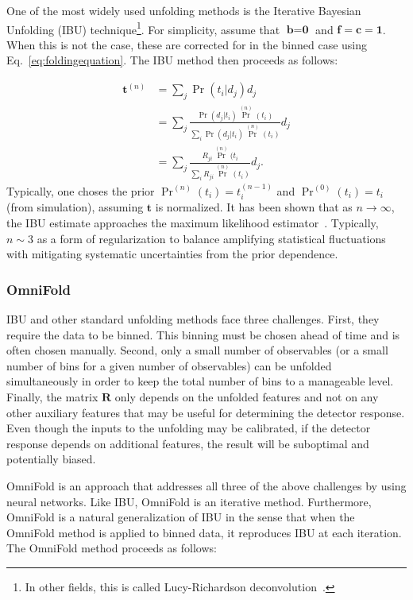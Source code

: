 \documentclass[NOTE, atlasdraft=true, texlive=2016, UKenglish]{\ATLASLATEXPATH atlasdoc}
\begin{document}
One of the most widely used unfolding methods is the Iterative Bayesian Unfolding (IBU) technique\footnote{In other fields, this is called Lucy-Richardson deconvolution~\cite{1974AJ.....79..745L,Richardson:72}.}.   For simplicity, assume that $\textbf{b}=\textbf{0}$ and $\textbf{f}=\textbf{c}=\textbf{1}$.  When this is not the case, these are corrected for in the binned case using Eq.~\ref{eq:foldingequation}.   The IBU method then proceeds as follows:

\begin{align}
\textbf{t}^{(n)}&=\sum_j \Pr(t_i|d_j) d_j \\
&=\sum_j \frac{\Pr(d_j|t_i)\Pr^{(n)}(t_i)}{\sum_i \Pr(d_j|t_i)\Pr^{(n)}(t_i)} d_j \\
&=\sum_j \frac{R_{ji}\Pr^{(n)}(t_i}{\sum_i R_{ji}\Pr^{(n)}(t_i)} d_j.
\end{align}
%
Typically, one choses the prior $\Pr^{(n)}(t_i)=t_i^{(n-1)}$ and $\Pr^{(0)}(t_i)=t_i$ (from simulation), assuming $\textbf{t}$ is normalized.  It has been shown that as $n\rightarrow\infty$, the IBU estimate approaches the maximum likelihood estimator~\cite{shepp1982maximum}.  Typically, $n\sim 3$ as a form of regularization to balance amplifying statistical fluctuations with mitigating systematic uncertainties from the prior dependence.

\subsubsection{OmniFold}
\label{subsec:omnifold}

IBU and other standard unfolding methods face three challenges.  First, they require the data to be binned.  This binning must be chosen ahead of time and is often chosen manually.  Second, only a small number of observables (or a small number of bins for a given number of observables) can be unfolded simultaneously in order to keep the total number of bins to a manageable level.  Finally, the matrix $\textbf{R}$ only depends on the unfolded features and not on any other auxiliary features that may be useful for determining the detector response.  Even though the inputs to the unfolding may be calibrated, if the detector response depends on additional features, the result will be suboptimal and potentially biased.

OmniFold is an approach that addresses all three of the above challenges by using neural networks.  Like IBU, OmniFold is an iterative method.  Furthermore, OmniFold is a natural generalization of IBU in the sense that when the OmniFold method is applied to binned data, it reproduces IBU at each iteration.  The OmniFold method proceeds as follows:
\end{document}
